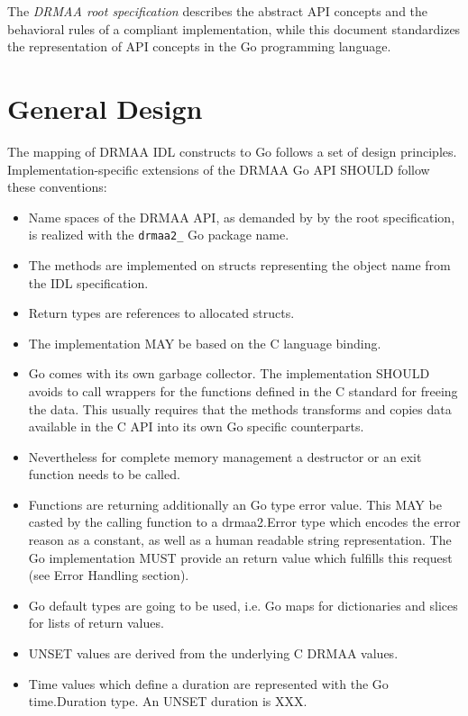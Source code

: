 \documentclass{article}
\newcommand{\h}[1]{\texttt{#1}}
\begin{document}
The \emph{DRMAA root specification} \cite{gfd194} describes the abstract API concepts and the behavioral rules of a compliant implementation, while this document standardizes the representation of API concepts in the Go programming language.

\section{General Design}
\label{sec:concepts}

The mapping of DRMAA IDL constructs to Go follows a set of design principles. Implementation-specific extensions of the DRMAA Go API SHOULD follow these conventions:

\begin{itemize}
\item Name spaces of the DRMAA API, as demanded by by the root specification, is realized with the \h{drmaa2\_} Go package name.
\item The methods are implemented on structs representing the object name from the IDL specification.
\item Return types are references to allocated structs.
\item The implementation MAY be based on the C language binding.
\item Go comes with its own garbage collector. The implementation SHOULD avoids to call wrappers for the functions defined in the C standard for freeing the data. This usually requires that the methods transforms and copies data available in the C API into its own Go specific counterparts.
\item Nevertheless for complete memory management a destructor or an exit function needs to be called.
\item Functions are returning additionally an Go type error value. This MAY be casted by the calling function to a drmaa2.Error type which encodes the error reason as a constant, as well as a human readable string representation. The Go implementation MUST provide an return value which fulfills this request (see Error Handling section). 
\item Go default types are going to be used, i.e. Go maps for dictionaries and slices for lists of return values.
\item UNSET values are derived from the underlying C DRMAA values.
\item Time values which define a duration are represented with the Go time.Duration type. An UNSET duration is XXX.
\end{itemize}
\end{document}
